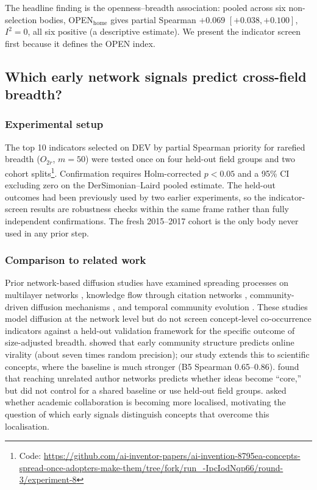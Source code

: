 \documentclass[11pt,letterpaper]{article}
\begin{document}
The headline finding is the openness--breadth association: pooled across six non-selection bodies, OPEN$_{\text{home}}$ gives partial Spearman $+0.069$ $[+0.038, +0.100]$, $I^2 = 0$, all six positive (a descriptive estimate). We present the indicator screen first because it defines the OPEN index.

\subsection{Which early network signals predict cross-field breadth?}

\subsubsection{Experimental setup}

The top 10 indicators selected on DEV by partial Spearman priority for rarefied breadth ($O_{2r}$, $m = 50$) were tested once on four held-out field groups and two cohort splits\footnote{Code: \url{https://github.com/ai-inventor-papers/ai-invention-8795ea-concepts-spread-once-adopters-make-them/tree/fork/run_-IpcIodNqp66/round-3/experiment-8}}. Confirmation requires Holm-corrected $p < 0.05$ and a 95\% CI excluding zero on the DerSimonian--Laird pooled estimate. The held-out outcomes had been previously used by two earlier experiments, so the indicator-screen results are robustness checks within the same frame rather than fully independent confirmations. The fresh 2015--2017 cohort is the only body never used in any prior step.

\subsubsection{Comparison to related work}

Prior network-based diffusion studies have examined spreading processes on multilayer networks \citep{Domenico2016}, knowledge flow through citation networks \citep{Renoust2017}, community-driven diffusion mechanisms \citep{Cherifi2019,Milli2018}, and temporal community evolution \citep{Sattar2023,Gao2018}. These studies model diffusion at the network level but do not screen concept-level co-occurrence indicators against a held-out validation framework for the specific outcome of size-adjusted breadth. \citet{Weng2013} showed that early community structure predicts online virality (about seven times random precision); our study extends this to scientific concepts, where the baseline is much stronger (B5 Spearman 0.65--0.86). \citet{Cheng2023} found that reaching unrelated author networks predicts whether ideas become ``core,'' but did not control for a shared baseline or use held-out field groups. \citet{Fitzgerald2021} asked whether academic collaboration is becoming more localised, motivating the question of which early signals distinguish concepts that overcome this localisation.
\end{document}

